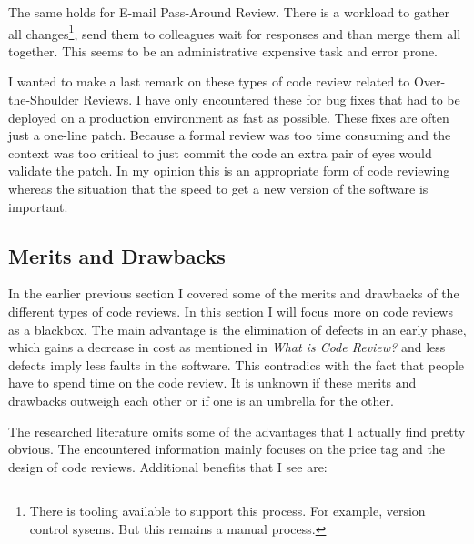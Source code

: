 The same holds for E-mail Pass-Around Review. There is a workload to gather all changes\footnote{There is tooling available to support this process. For example, version control sysems. But this remains a manual process.},
send them to colleagues wait for responses and than merge them all together.
This seems to be an administrative expensive task and error prone.

I wanted to make a last remark on these types of code review related to Over-the-Shoulder Reviews.
I have only encountered these for bug fixes that had to be deployed on a production environment as fast as possible.
These fixes are often just a one-line patch.
Because a formal review was too time consuming and the context was too critical to just commit the code an extra pair of eyes would validate the patch.
In my opinion this is an appropriate form of code reviewing whereas the situation that the speed to get a new version of the software is important.

\subsection*{Merits and Drawbacks}

In the earlier previous section I covered some of the merits and drawbacks of the different types of code reviews. In this section I will focus more on code reviews as a blackbox.
The main advantage is the elimination of defects in an early phase, which gains a decrease in cost as mentioned in \textit{What is Code Review?} and less defects imply less faults in the software.
This contradics with the fact that people have to spend time on the code review.
It is unknown if these merits and drawbacks outweigh each other or if one is an umbrella for the other.

The researched literature omits some of the advantages that I actually find pretty obvious.
The encountered information mainly focuses on the price tag and the design of code reviews.
Additional benefits that I see are:

